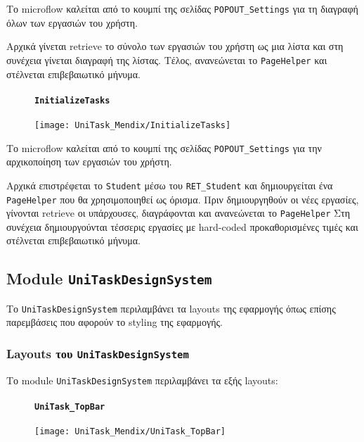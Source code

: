                 Το microflow καλείται από το κουμπί της σελίδας \texttt{POPOUT\_Settings} για τη διαγραφή όλων των εργασιών του χρήστη.

                Αρχικά γίνεται retrieve το σύνολο των εργασιών του χρήστη ως μια λίστα και στη συνέχεια γίνεται διαγραφή της λίστας. Τέλος, ανανεώνεται το \texttt{PageHelper} και στέλνεται επιβεβαιωτικό μήνυμα.

                \begin{figure}[H] \noindent
                    \paragraph{\texttt{InitializeTasks}}
                    \begin{center}
                        \texttt{[image: UniTask\_Mendix/InitializeTasks]}
                    \end{center}
                \end{figure}

                Το microflow καλείται από το κουμπί της σελίδας \texttt{POPOUT\_Settings} για την αρχικοποίηση των εργασιών του χρήστη.

                Αρχικά επιστρέφεται το \texttt{Student} μέσω του \texttt{RET\_Student} και δημιουργείται ένα \texttt{PageHelper} που θα χρησιμοποιηθεί ως όρισμα. Πριν δημιουργηθούν οι νέες εργασίες, γίνονται retrieve οι υπάρχουσες, διαγράφονται και ανανεώνεται το \texttt{PageHelper} Στη συνέχεια δημιουργούνται τέσσερις εργασίες με hard-coded προκαθορισμένες τιμές και στέλνεται επιβεβαιωτικό μήνυμα.

        \subsection{Module \texttt{UniTaskDesignSystem}}
            Το \texttt{UniTaskDesignSystem} περιλαμβάνει τα layouts της εφαρμογής όπως επίσης παρεμβάσεις που αφορούν το styling της εφαρμογής.

            \subsubsection{Layouts του \texttt{UniTaskDesignSystem}}
                Το module \texttt{UniTaskDesignSystem} περιλαμβάνει τα εξής layouts:

                \begin{figure}[H] \noindent
                    \paragraph{\texttt{UniTask\_TopBar}}
                    \begin{center}
                        \texttt{[image: UniTask\_Mendix/UniTask\_TopBar]}
                    \end{center}
                \end{figure}

